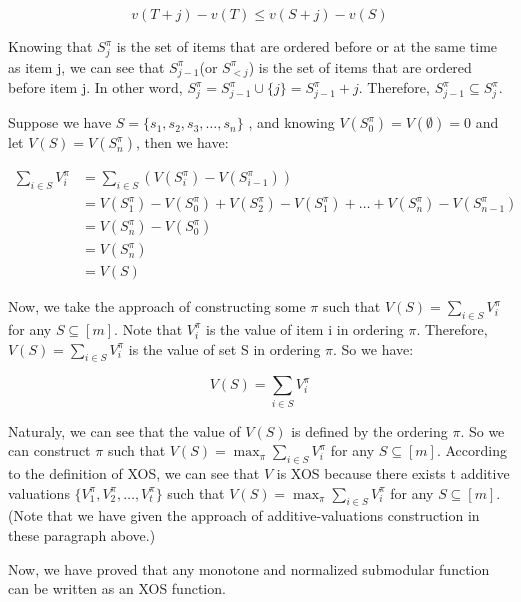 \documentclass{article}
\begin{document}
\[v(T+j) - v(T) \le v(S+j) - v(S)\]

Knowing that $S^{\pi}_j$ is the set of items that are ordered before or at the same time as item j, we can see that $S^{\pi}_{j-1}$(or $S^{\pi}_{<j}$) is the set of items that are ordered before item j. In other word, $S^{\pi}_{j} = S^{\pi}_{j-1} \cup \{j\} = S^{\pi}_{j-1} + j$. Therefore, $S^{\pi}_{j-1} \subseteq S^{\pi}_j$. 

Suppose we have  $S = \{s_1,s_2,s_3,\ldots,s_n\}$ , and knowing  $V(S^{\pi}_0) = V(\emptyset) = 0$ and let $V(S) = V(S^{\pi}_n)$, 
then we have:

\begin{equation}
   \begin{aligned}
      \sum_{i\in S} V^{\pi}_i  &= \sum_{i\in S} (V(S^{\pi}_i) - V(S^{\pi}_{i-1})) \\
           &= V(S^{\pi}_1) - V(S^{\pi}_{0}) + V(S^{\pi}_2) - V(S^{\pi}_{1}) + \ldots + V(S^{\pi}_n) - V(S^{\pi}_{n-1}) \\
           &= V(S^{\pi}_n) - V(S^{\pi}_{0}) \\
           &= V(S^{\pi}_n) \\
           &= V(S)
   \end{aligned}
   \label{eq:1}
\end{equation}

Now, we take the approach of constructing some $\pi$ such that $V(S) = \sum_{i\in S} V^{\pi}_i$ for any $S \subseteq [m]$. Note that $V^{\pi}_i$ is the value of item i in ordering $\pi$. Therefore, $V(S) = \sum_{i\in S} V^{\pi}_i$ is the value of set S in ordering $\pi$. So we have:

\[
   V(S) = \sum_{i\in S} V^{\pi}_i
\]

Naturaly, we can see that the value of $V(S)$ is defined by the ordering $\pi$. So we can construct $\pi$ such that $V(S) = \max_{\pi}\sum_{i\in S} V^{\pi}_i$ for any $S \subseteq [m]$. According to the definition of XOS, we can see that $V$ is XOS because there exists t additive valuations $\{V^{\pi}_1, V^{\pi}_2, \ldots, V^{\pi}_t\}$ such that $V(S) = \max_{\pi}\sum_{i\in S} V^{\pi}_i$ for any $S \subseteq [m]$.(Note that we have given the approach of additive-valuations construction in these paragraph above.)

Now, we have proved that any monotone and normalized submodular function can be written as an XOS function.

\newpage



\end{document}
